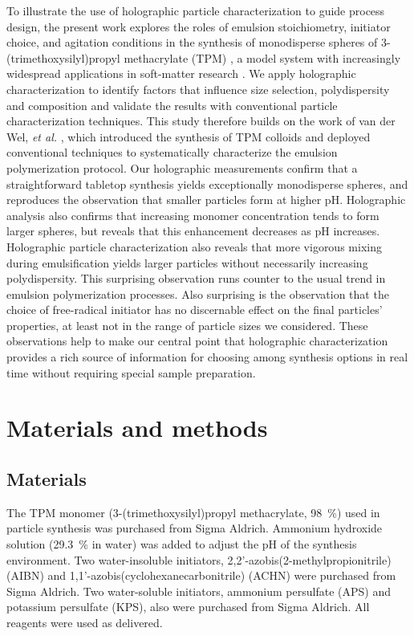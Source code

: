 \documentclass[journal=langd5,manuscript=article]{achemso}
\begin{document}
To illustrate the use of holographic particle characterization
to guide process design, the present work
explores the roles of emulsion stoichiometry, initiator choice, and
agitation conditions in the synthesis of monodisperse spheres of
3-(trimethoxysilyl)propyl methacrylate (TPM) \cite{vanderwel17},
a model system with increasingly widespread applications
in soft-matter research \cite{sacanna11,liu16,vanderwel18}.
We apply holographic characterization
to identify factors that influence size selection, polydispersity
and composition and validate the results with conventional particle
characterization techniques.
This study therefore builds on the work of van der Wel, \emph{et al.}
\cite{vanderwel17}, which introduced the synthesis of TPM colloids
and deployed conventional techniques to systematically
characterize the emulsion polymerization protocol.
Our holographic measurements confirm that a straightforward
tabletop synthesis yields exceptionally monodisperse spheres,
and reproduces the observation \cite{vanderwel17}
that smaller particles form at higher pH.
Holographic analysis also confirms that increasing
monomer concentration tends to form larger spheres,
but reveals that this enhancement decreases as pH increases.
Holographic particle characterization also reveals that more vigorous
mixing during emulsification yields larger
particles without necessarily increasing polydispersity.
This surprising observation runs counter to the usual trend in
emulsion polymerization processes.
Also surprising is the observation that the
choice of free-radical initiator has no discernable
effect on the final particles' properties, at least not
in the range of particle sizes we considered.
These observations help to make our central point that holographic
characterization provides a rich source of information
for choosing among synthesis options in real time
without requiring special sample preparation.

\section{Materials and methods}
\label{sec:experimental}

\subsection{Materials}
\label{sec:materials}
The TPM monomer (3-(trimethoxysilyl)propyl methacrylate, \SI{98}{\percent})
used in particle synthesis was purchased from Sigma Aldrich. 
Ammonium hydroxide solution (\SI{29.3}{\percent}  in water) was added to adjust
the pH of the synthesis environment.
Two water-insoluble initiators, 2,2'-azobis(2-methylpropionitrile) (AIBN)
and 1,1'-azobis(cyclohexanecarbonitrile) (ACHN)
were purchased from Sigma Aldrich.
Two water-soluble initiators, 
ammonium persulfate (APS) and potassium persulfate (KPS),
also were purchased from Sigma Aldrich.
All reagents were used as delivered.
\end{document}
